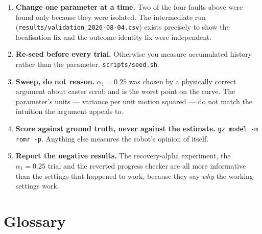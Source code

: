 \documentclass[11pt,a4paper]{report}
\newcommand{\file}[1]{\texttt{\small #1}}
\begin{document}
\begin{plain}
\begin{enumerate}[leftmargin=1.6em,itemsep=4pt]
\item \textbf{Change one parameter at a time.} Two of the four faults above
were found only because they were isolated. The intermediate run
(\file{results/validation\_2026-08-04.csv}) exists precisely to show the
localisation fix and the outcome-identity fix were independent.

\item \textbf{Re-seed before every trial.} Otherwise you measure accumulated
history rather than the parameter. \file{scripts/seed.sh}.

\item \textbf{Sweep, do not reason.} $\alpha_1 = 0.25$ was chosen by a
physically correct argument about caster scrub and is the worst point on the
curve. The parameter's units --- variance per unit motion squared --- do not
match the intuition the argument appeals to.

\item \textbf{Score against ground truth, never against the estimate.}
\file{gz model -m romr -p}. Anything else measures the robot's opinion of
itself.

\item \textbf{Report the negative results.} The recovery-alpha experiment, the
$\alpha_1 = 0.25$ trial and the reverted progress checker are all more
informative than the settings that happened to work, because they say
\emph{why} the working settings work.
\end{enumerate}
\end{plain}

\chapter{Glossary}
\label{ch:glossary}
\end{document}

